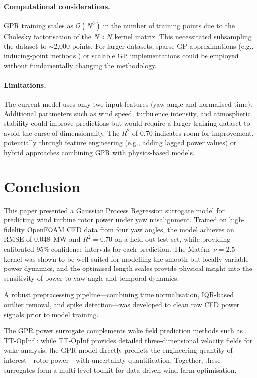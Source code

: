 \documentclass[12pt]{article}
\begin{document}
\paragraph{Computational considerations.}
GPR training scales as $\mathcal{O}(N^3)$ in the number of training points due to the Cholesky factorisation of the $N \times N$ kernel matrix.
This necessitated subsampling the dataset to $\sim$2{,}000 points.
For larger datasets, sparse GP approximations (e.g., inducing-point methods \citep{Titsias2009}) or scalable GP implementations could be employed without fundamentally changing the methodology.

\paragraph{Limitations.}
The current model uses only two input features (yaw angle and normalised time).
Additional parameters such as wind speed, turbulence intensity, and atmospheric stability could improve predictions but would require a larger training dataset to avoid the curse of dimensionality.
The $R^2$ of 0.70 indicates room for improvement, potentially through feature engineering (e.g., adding lagged power values) or hybrid approaches combining GPR with physics-based models.


\section{Conclusion}
\label{sec:conclusion}

This paper presented a Gaussian Process Regression surrogate model for predicting wind turbine rotor power under yaw misalignment.
Trained on high-fidelity OpenFOAM CFD data from four yaw angles, the model achieves an RMSE of 0.048~MW and $R^2 = 0.70$ on a held-out test set, while providing calibrated 95\% confidence intervals for each prediction.
The Mat\'{e}rn~$\nu = 2.5$ kernel was shown to be well suited for modelling the smooth but locally variable power dynamics, and the optimised length scales provide physical insight into the sensitivity of power to yaw angle and temporal dynamics.

A robust preprocessing pipeline---combining time normalisation, IQR-based outlier removal, and spike detection---was developed to clean raw CFD power signals prior to model training.

The GPR power surrogate complements wake field prediction methods such as TT-OpInf \citep{Tabib2025ttopinf}: while TT-OpInf provides detailed three-dimensional velocity fields for wake analysis, the GPR model directly predicts the engineering quantity of interest---rotor power---with uncertainty quantification.
Together, these surrogates form a multi-level toolkit for data-driven wind farm optimisation.
\end{document}
